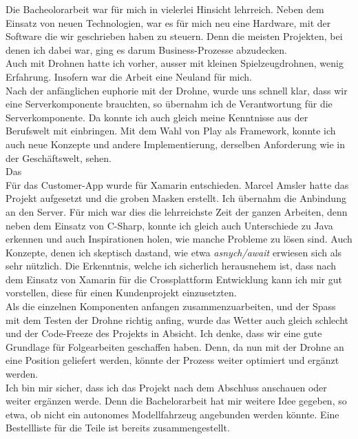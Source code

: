 Die Bacheolorarbeit war für mich in vielerlei Hinsicht lehrreich. 
Neben dem Einsatz von neuen Technologien, war es für mich neu eine Hardware, mit der Software die wir geschrieben haben zu steuern.
Denn die meisten Projekten, bei denen ich dabei war, ging es darum Business-Prozesse abzudecken.
\\

Auch mit Drohnen hatte ich vorher, ausser mit kleinen Spielzeugdrohnen, wenig Erfahrung. Insofern war die Arbeit eine Neuland für mich.
\\

Nach der anfänglichen euphorie mit der Drohne, wurde uns schnell klar, dass wir eine Serverkomponente brauchten, so übernahm ich de Verantwortung für die Serverkomponente. 
Da konnte ich auch gleich meine Kenntnisse aus der Berufswelt mit einbringen. 
Mit dem Wahl von Play als Framework, konnte ich auch neue Konzepte und andere Implementierung, derselben Anforderung wie in der Geschäftswelt, sehen. 
\\

Das 
\\

Für das Customer-App wurde für Xamarin entschieden.
Marcel Amsler hatte das Projekt aufgesetzt und die groben Masken erstellt. Ich übernahm die Anbindung an den Server.
Für mich war dies die lehrreichste Zeit der ganzen Arbeiten, denn neben dem Einsatz von C-Sharp, konnte ich gleich auch Unterschiede zu Java erkennen und auch Inspirationen holen, wie manche Probleme zu lösen sind. Auch Konzepte, denen ich skeptisch dastand, wie etwa \textit{asnych/await} erwiesen sich als sehr nützlich. Die Erkenntnis, welche ich sicherlich herausnehem ist, dass nach dem Einsatz von Xamarin für die Crossplattform Entwicklung kann ich mir gut vorstellen, diese für einen Kundenprojekt einzusetzten. 
\\

Als die einzelnen Komponenten anfangen zusammenzuarbeiten, und der Spass mit dem Testen der Drohne richtig anfing, wurde das Wetter auch gleich schlecht und der Code-Freeze des Projekts in Absicht. Ich denke, dass wir eine gute Grundlage für Folgearbeiten geschaffen haben. Denn, da nun mit der Drohne an eine Position geliefert werden, könnte der Prozess weiter optimiert und ergänzt werden. \\

Ich bin mir sicher, dass ich das Projekt nach dem Abschluss anschauen oder weiter ergänzen werde. Denn die Bachelorarbeit hat mir weitere Idee gegeben, so etwa, ob nicht ein autonomes Modellfahrzeug angebunden werden könnte. Eine Bestellliste für die Teile ist bereits zusammengestellt.











